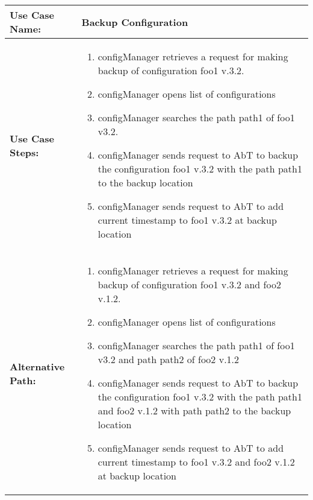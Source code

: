 
\begin{tabularx}{\linewidth}{|l|X|}
\hline
\textbf{Use Case Name:} & \textbf{Backup Configuration} \\
\hline
\textbf{Use Case Steps:} & 
\begin{minipage}{\linewidth} 
  \vspace{0.05em}
  \begin{enumerate}
	\item configManager retrieves a request for making backup of configuration foo1 v.3.2.
	\item configManager opens list of configurations
	\item configManager searches the path path1 of  foo1 v3.2.
	\item configManager sends request to AbT to backup the configuration foo1 v.3.2 with the path path1 to the backup location 
	\item configManager sends request to AbT to add current timestamp to foo1 v.3.2 at backup location 
  \end{enumerate}
  \vspace{0.05em}
\end{minipage}
\\
\hline 
\textbf{Alternative Path:} &
\begin{minipage}{\linewidth}
  \vspace{0.05em} 
  \begin{enumerate}
	\item configManager retrieves a request for making backup of configuration foo1 v.3.2 and foo2 v.1.2.
	\item configManager opens list of configurations
	\item configManager searches the path path1 of  foo1 v3.2 and path path2 of foo2 v.1.2
	\item configManager sends request to AbT to backup the configuration foo1 v.3.2 with the path path1 and foo2 v.1.2 with path path2 to the backup location 
	\item configManager sends request to AbT to add current timestamp to foo1 v.3.2 and foo2 v.1.2 at backup location 
  \end{enumerate}  
  \vspace{0.05em} 
\end{minipage}
\\
\hline
\end{tabularx}


